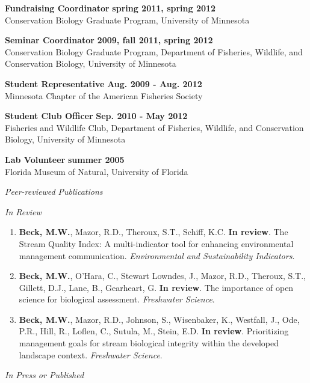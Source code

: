 \documentclass[letterpaper,12pt]{article}
\newcommand{\sectitle}[1]{\vspace{\baselineskip} \centerline{\large{\textit{#1}}}}
\newcommand{\subsectitle}[1]{\vspace{\baselineskip} \centerline{\normalsize{\textit{#1}}}}
\begin{document}
{\bf Fundraising Coordinator} \hfill {\bf spring 2011, spring 2012} \\
Conservation Biology Graduate Program, University of Minnesota

{\bf Seminar Coordinator} \hfill {\bf 2009, fall 2011, spring 2012} \\
Conservation Biology Graduate Program, Department of Fisheries, Wildlife, and Conservation Biology, University of Minnesota

{\bf Student Representative} \hfill {\bf Aug. 2009 - Aug. 2012} \\
Minnesota Chapter of the American Fisheries Society

{\bf Student Club Officer} \hfill {\bf Sep. 2010 - May 2012} \\
Fisheries and Wildlife Club, Department of Fisheries, Wildlife, and Conservation Biology, University of Minnesota 

{\bf Lab Volunteer} \hfill {\bf summer 2005} \\
Florida Museum of Natural, University of Florida

\sectitle{Peer-reviewed Publications}

\subsectitle{In Review}

\begin{enumerate}

\item \textbf{Beck, M.W.}, Mazor, R.D., Theroux, S.T., Schiff, K.C. \textbf{In review}. The Stream Quality Index: A multi-indicator tool for enhancing environmental management communication. \textit{Environmental and Sustainability Indicators}.

\item \textbf{Beck, M.W.}, O'Hara, C., Stewart Lowndes, J., Mazor, R.D., Theroux, S.T., Gillett, D.J., Lane, B., Gearheart, G. \textbf{In review}. The importance of open science for biological assessment. \textit{Freshwater Science}.

\item \textbf{Beck, M.W.}, Mazor, R.D., Johnson, S., Wisenbaker, K., Westfall, J., Ode, P.R., Hill, R., Loflen, C., Sutula, M., Stein, E.D. \textbf{In review}. Prioritizing management goals for stream biological integrity within the developed landscape context. \textit{Freshwater Science}.

\end{enumerate}

\subsectitle{In Press or Published}
\end{document}
